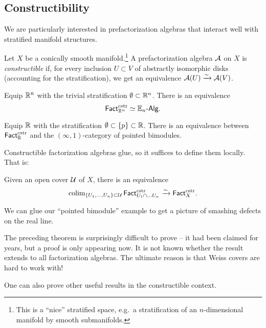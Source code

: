 \subsection{Constructibility}

We are particularly interested in prefactorization algebras that interact well with stratified manifold structures.

\begin{dfn}
	Let $X$ be a conically smooth manifold.\footnote{This is a ``nice'' stratified space, e.g.\ a stratification of an $n$-dimensional manifold by smooth submanifolds.}
	A prefactorization algebra $\mathcal{A}$ on $X$ is \emph{constructible} if, for every inclusion $U \subset V$ of abstractly isomorphic disks (accounting for the stratification), we get an equivalence $\mathcal{A}(U) \xrightarrow{\sim} \mathcal{A}(V)$.
\end{dfn}

\begin{thm}[Lurie]
	Equip $\mathbb{R}^n$ with the trivial stratification $\emptyset \subset \mathbb{R}^n$.
	There is an equivalence
	\[
		\mathsf{Fact}_{\mathbb{R}^n}^{\mathrm{cstr}} \simeq \mathbb{E}_n\textrm{-}\mathsf{Alg}.
	\]
\end{thm}

\begin{thm}
	Equip $\mathbb{R}$ with the stratification $\emptyset \subset \{ p \} \subset \mathbb{R}$.
	There is an equivalence between $\mathsf{Fact}_{\mathbb{R}}^{\mathrm{cstr}}$ and the $(\infty, 1)$-category of pointed bimodules. 
\end{thm}

Constructible factorization algebras glue, so it suffices to define them locally.
That is:

\begin{thm}
	Given an open cover $\mathcal{U}$ of $X$, there is an equivalence
	\[
		\operatorname{colim}_{\{U_1, \dots, U_n\} \subset \mathcal{U}} \mathsf{Fact}_{U_1 \cap \dots U_n}^{\mathrm{cstr}} \xrightarrow{\sim} \mathsf{Fact}_X^{\mathrm{cstr}}.
	\]
\end{thm}

\begin{ex}
	We can glue our ``pointed bimodule'' example to get a picture of smashing defects on the real line.
\end{ex}

The preceding theorem is surprisingly difficult to prove -- it had been claimed for years, but a proof is only appearing now.
It is not known whether the result extends to all factorization algebras.
The ultimate reason is that Weiss covers are hard to work with!

One can also prove other useful results in the constructible context.

